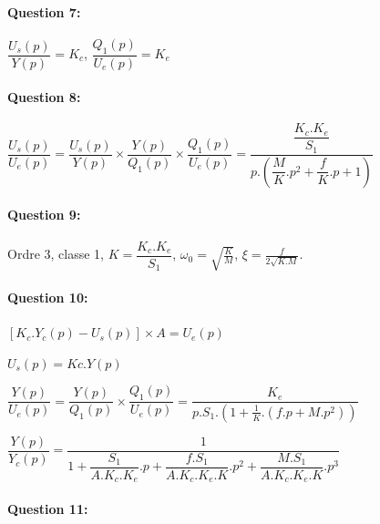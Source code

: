 \paragraph{Question 7:}

$\dfrac{U_s(p)}{Y(p)}=K_c$,
$\dfrac{Q_1(p)}{U_e(p)}=K_e$


\paragraph{Question 8:}

$\dfrac{U_s(p)}{U_e(p)}=\dfrac{U_s(p)}{Y(p)}\times\dfrac{Y(p)}{Q_1(p)}\times\dfrac{Q_1(p)}{U_e(p)}=\dfrac{\dfrac{K_c.K_e}{S_1}}{p.\left(\dfrac{M}{K}.p^2+\dfrac{f}{K}.p+1\right)}$

\paragraph{Question 9:}

Ordre 3, classe 1, $K=\dfrac{K_c.K_e}{S_1}$, $\omega_0=\sqrt{\frac{K}{M}}$, $\xi=\frac{f}{2\sqrt{K.M}}$.

\paragraph{Question 10:}

$\left[K_c.Y_c(p)-U_s(p)\right] \times A=U_e(p)$

$U_s(p)=Kc.Y(p)$

$\dfrac{Y(p)}{U_e(p)}=\dfrac{Y(p)}{Q_1(p)}\times \dfrac{Q_1(p)}{U_e(p)}=\dfrac{K_e}{p.S_1.(1+\frac{1}{K}.(f.p+M.p^2))}$

$\dfrac{Y(p)}{Y_c(p)}=\dfrac{1}{1+\dfrac{S_1}{A.K_c.K_e}.p+\dfrac{f.S_1}{A.K_c.K_e.K}.p^2+\dfrac{M.S_1}{A.K_c.K_e.K}.p^3}$

\paragraph{Question 11:}

